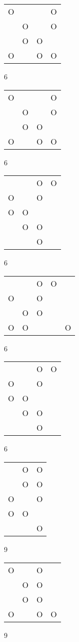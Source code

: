 \begin{tabular}{|m{0.2cm}m{0.2cm}m{0.2cm}m{0.2cm}|}\hline
O& & &O\\
 &O& &O\\
 &O&O& \\
O& &O&O\\
\hline\end{tabular}6
\begin{tabular}{|m{0.2cm}m{0.2cm}m{0.2cm}m{0.2cm}|}\hline
O& & &O\\
 &O& &O\\
 &O&O& \\
O& &O&O\\
\hline\end{tabular}6
\begin{tabular}{|m{0.2cm}m{0.2cm}m{0.2cm}m{0.2cm}|}\hline
 & &O&O\\
O& &O& \\
O&O& & \\
 &O&O& \\
 & &O& \\
\hline\end{tabular}6
\begin{tabular}{|m{0.2cm}m{0.2cm}m{0.2cm}m{0.2cm}m{0.2cm}|}\hline
 & &O&O& \\
O& &O& & \\
 &O&O& & \\
O&O& & &O\\
\hline\end{tabular}6
\begin{tabular}{|m{0.2cm}m{0.2cm}m{0.2cm}m{0.2cm}|}\hline
 & &O&O\\
O& &O& \\
O&O& & \\
 &O&O& \\
 & &O& \\
\hline\end{tabular}6
\begin{tabular}{|m{0.2cm}m{0.2cm}m{0.2cm}|}\hline
 &O&O\\
 &O&O\\
O& &O\\
O&O& \\
 & &O\\
\hline\end{tabular}9
\begin{tabular}{|m{0.2cm}m{0.2cm}m{0.2cm}m{0.2cm}|}\hline
O& &O& \\
 &O&O& \\
 &O&O& \\
O& &O&O\\
\hline\end{tabular}9
